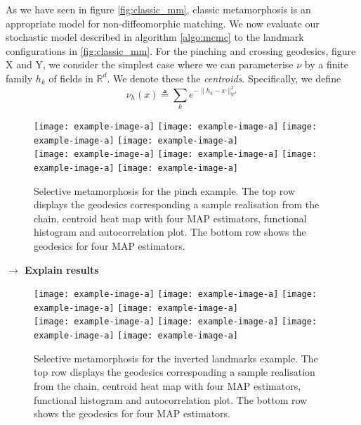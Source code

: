 \documentclass{article}
\newcommand{\Rd}{\mathbb{R}^{d}}
\begin{document}
As we have seen in figure \ref{fig:classic_mm}, classic metamorphosis is an
appropriate model for non-diffeomorphic matching. We now evaluate our stochastic
model described in algorithm \ref{algo:mcmc} to the landmark configurations in
\ref{fig:classic_mm}. For the pinching and crossing geodesics, figure X and Y,
we consider the simplest case where we can parameterise $\nu$ by a finite family
$h_k$ of fields in $\Rd$. We denote these the \textit{centroids}. Specifically,
we define \begin{equation} \nu_h (x) \triangleq \sum_k e^{-\|h_k - x\|_{\Rd}^2}
\end{equation}

\begin{figure}
\centering
\begin{minipage}{\textwidth}
  \centering
    \texttt{[image: example-image-a]}\quad
    \texttt{[image: example-image-a]}\quad
    \texttt{[image: example-image-a]}\quad
    \texttt{[image: example-image-a]}\\[0.25cm]
    \texttt{[image: example-image-a]}\quad
    \texttt{[image: example-image-a]}\quad
    \texttt{[image: example-image-a]}\quad
    \texttt{[image: example-image-a]}
    \caption{Selective metamorphosis for the pinch example. The top row displays
    the geodesics corresponding a sample realisation from the chain, centroid
    heat map with four MAP estimators, functional histogram and autocorrelation
    plot. The bottom row shows the geodesics for four MAP estimators.}
    \label{fig:selective:pinch}
\end{minipage}
\end{figure}

\textbf{$\longrightarrow$ Explain results}\\

\begin{figure}
\centering
\begin{minipage}{\textwidth}
  \centering
    \texttt{[image: example-image-a]}\quad
    \texttt{[image: example-image-a]}\quad
    \texttt{[image: example-image-a]}\quad
    \texttt{[image: example-image-a]}\\[0.25cm]
    \texttt{[image: example-image-a]}\quad
    \texttt{[image: example-image-a]}\quad
    \texttt{[image: example-image-a]}\quad
    \texttt{[image: example-image-a]}
    \caption{Selective metamorphosis for the inverted landmarks example. The top
    row displays the geodesics corresponding a sample realisation from the
    chain, centroid heat map with four MAP estimators, functional histogram and
    autocorrelation plot. The bottom row shows the geodesics for four MAP
    estimators.}
    \label{fig:selective:crossing}
\end{minipage}
\end{figure}
\end{document}
